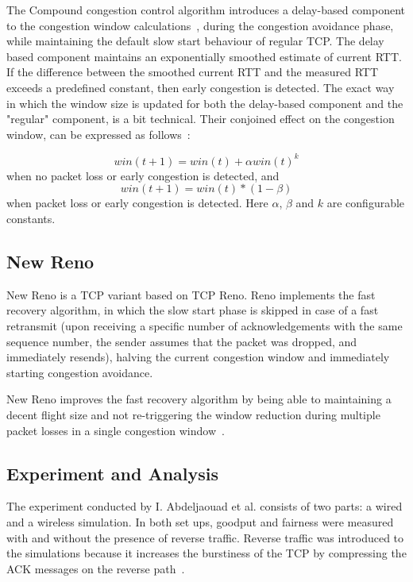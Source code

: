 The Compound congestion control algorithm introduces a delay-based component to the congestion window calculations~\cite{Tan05}, during the congestion avoidance phase, while maintaining the default slow start behaviour of regular TCP. The delay based component maintains an exponentially smoothed estimate of current RTT. If the difference between the smoothed current RTT and the measured RTT exceeds a predefined constant, then early congestion is detected. The exact way in which the window size is updated for both the delay-based component and the "regular" component, is a bit technical. Their conjoined effect on the congestion window, can be expressed as follows~\cite{Tan05}:

\[
win(t + 1) = win(t) + \alpha win(t)^k
\]
when no packet loss or early congestion is detected, and
\[
win(t + 1) = win(t) * (1 - \beta)
\]
when packet loss or early congestion is detected. Here $\alpha$, $\beta$ and $k$ are configurable constants. 
  
\subsection{New Reno}

New Reno is a TCP variant based on TCP Reno. Reno implements the fast recovery algorithm, in which the slow start phase is skipped in case of a fast retransmit (upon receiving a specific number of acknowledgements with the same sequence number, the sender assumes that the packet was dropped, and immediately resends), halving the current congestion window and immediately starting congestion avoidance. 

New Reno improves the fast recovery algorithm by being able to maintaining a decent flight size and not re-triggering the window reduction during multiple packet losses in a single congestion window~\cite{rfc6582}.  

\subsection{Experiment and Analysis}

The experiment conducted by I. Abdeljaouad et al. consists of two parts: a wired and a wireless simulation. In both set ups, goodput and fairness were measured with and without the presence of reverse traffic. Reverse traffic was introduced to the simulations because it increases the burstiness of the TCP by compressing the ACK messages on the reverse path~\cite{Abdeljaouad10}. 


